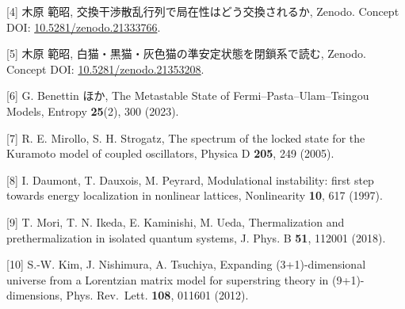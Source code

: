 \documentclass[
  a4paper,
]{ltjsarticle}
\begin{document}
{[}4{]} 木原 範昭, 交換干渉散乱行列で局在性はどう交換されるか, Zenodo.
Concept DOI:
\href{https://doi.org/10.5281/zenodo.21333766}{10.5281/zenodo.21333766}.

{[}5{]} 木原 範昭, 白猫・黒猫・灰色猫の準安定状態を閉鎖系で読む, Zenodo.
Concept DOI:
\href{https://doi.org/10.5281/zenodo.21353208}{10.5281/zenodo.21353208}.

{[}6{]} G. Benettin ほか, The Metastable State of
Fermi--Pasta--Ulam--Tsingou Models, Entropy \textbf{25}(2), 300 (2023).

{[}7{]} R. E. Mirollo, S. H. Strogatz, The spectrum of the locked state
for the Kuramoto model of coupled oscillators, Physica D \textbf{205},
249 (2005).

{[}8{]} I. Daumont, T. Dauxois, M. Peyrard, Modulational instability:
first step towards energy localization in nonlinear lattices,
Nonlinearity \textbf{10}, 617 (1997).

{[}9{]} T. Mori, T. N. Ikeda, E. Kaminishi, M. Ueda, Thermalization and
prethermalization in isolated quantum systems, J. Phys. B \textbf{51},
112001 (2018).

{[}10{]} S.-W. Kim, J. Nishimura, A. Tsuchiya, Expanding
(3+1)-dimensional universe from a Lorentzian matrix model for
superstring theory in (9+1)-dimensions, Phys. Rev.~Lett. \textbf{108},
011601 (2012).
\end{document}
